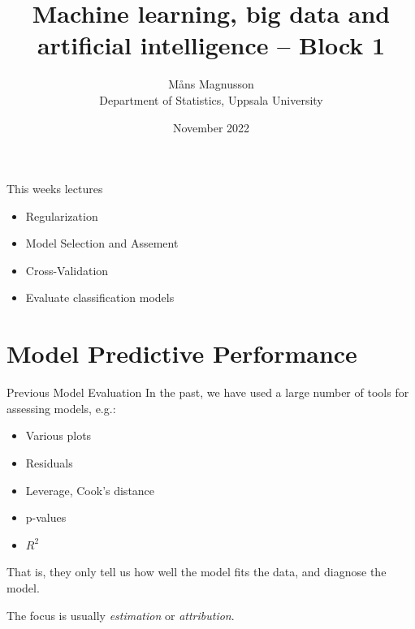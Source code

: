 \documentclass[10pt,handout]{beamer}
\title[]{{\color{black}Machine learning, big data and artificial intelligence -- Block 1}}
\author[]{M{\aa}ns Magnusson\\Department of Statistics, Uppsala University}
\date{November 2022}
\begin{document}
\frame{\titlepage
}



\begin{frame}{This weeks lectures}
\begin{itemize}
\item Regularization
\item Model Selection and Assement
\item Cross-Validation
\item Evaluate classification models
\end{itemize}
\end{frame}




\section{Model Predictive Performance}
\frame{\sectionpage}

\begin{frame}{Previous Model Evaluation}
In the past, we have used a large number of tools for assessing models, e.g.:

\begin{itemize}
\item Various plots
\item Residuals
\item Leverage, Cook's distance
\item p-values
\item $R^2$
\end{itemize}

That is, they only tell us {\color{uured}how well the model fits the data}, and diagnose the model. \pause

The focus is usually \emph{estimation} or \emph{attribution}.
\end{frame}
\end{document}
